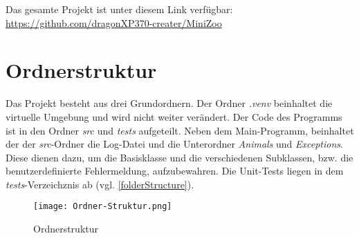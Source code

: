 Das gesamte Projekt ist unter diesem Link verfügbar: \url{https://github.com/dragonXP370-creater/MiniZoo}

\section{Ordnerstruktur}
Das Projekt besteht aus drei Grundordnern. Der Ordner \textit{.venv} beinhaltet die virtuelle Umgebung und wird nicht weiter verändert.
Der Code des Programms ist in den Ordner \textit{src} und \textit{tests} aufgeteilt. Neben dem Main-Programm, beinhaltet der der \textit{src}-Ordner die Log-Datei
und die Unterordner \textit{Animals} und \textit{Exceptions}. Diese dienen dazu, um die Basisklasse und die verschiedenen Subklassen, bzw. die benutzerdefinierte Fehlermeldung, aufzubewahren.
Die Unit-Tests liegen in dem \textit{tests}-Verzeichznis ab (vgl. \autoref{folderStructure}).
\begin{figure}[h]
    \centering
    \texttt{[image: Ordner-Struktur.png]}
    \caption{Ordnerstruktur}
    \label{folderStructure}
\end{figure}